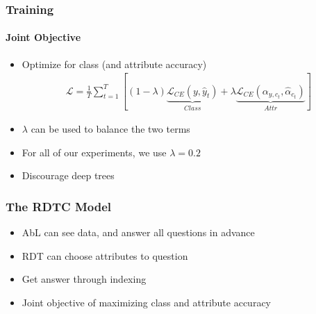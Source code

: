 \documentclass[9pt]{beamer}
\begin{document}
\begin{frame}
\frametitle{Training}
\framesubtitle{Joint Objective}
\begin{itemize}
	\item Optimize for class (and attribute accuracy)
	\begin{align*}
	\mathcal{L} = \frac{1}{T}\sum_{t=1}^{T}\left[(1-\lambda)\underbrace{\mathcal{L}_{CE}(y,\hat{y}_t)}_{Class} + \lambda \underbrace{\mathcal{L}_{CE}(\alpha_{y,c_t},\hat{\alpha}_{c_t})}_{Attr} \right]
	\end{align*}
	\item $\lambda$ can be used to balance the two terms
	\item For all of our experiments, we use $\lambda=0.2$
	\item Discourage deep trees%
\end{itemize}
\end{frame}



\begin{frame}
\frametitle{The RDTC Model \cite{alaniz2019explainable}}
\begin{itemize}
	\item AbL can see data, and answer all questions in advance
	\item RDT can choose attributes to question
	\item Get answer through indexing
	\item Joint objective of maximizing class and attribute accuracy
\end{itemize}
\end{frame}
\end{document}

